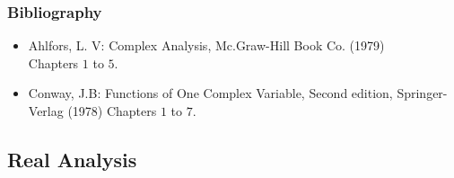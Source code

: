 \documentclass[spanish]{article}
\begin{document}
\subsubsection{Bibliography}
\begin{itemize}
  \item
Ahlfors, L. V: Complex Analysis, Mc.Graw-Hill Book Co. (1979)\\
Chapters $1$ to $5$.

  \item
Conway, J.B: Functions of One Complex Variable, Second edition, Springer-Verlag (1978)
Chapters $1$ to $7$.

\end{itemize}


\hrulefill%
\subsection{Real Analysis}
\end{document}
